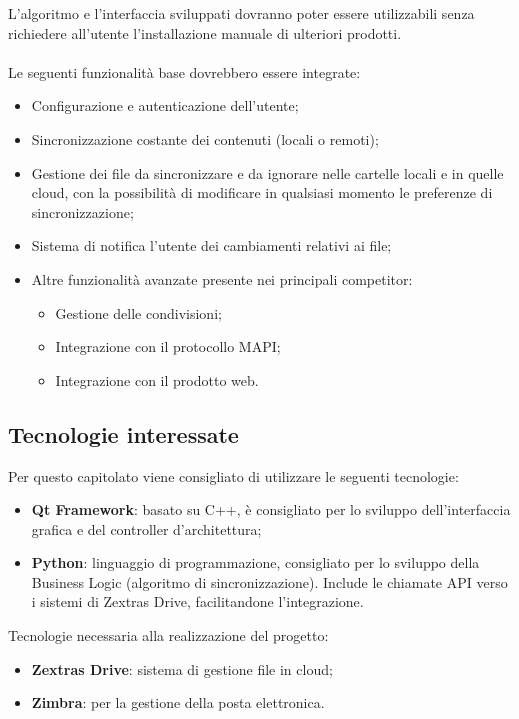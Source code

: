 \documentclass[../studio-di-fattibilita.tex]{subfiles}
\begin{document}
L’algoritmo e l’interfaccia sviluppati dovranno poter essere utilizzabili senza richiedere all’utente l’installazione manuale di ulteriori prodotti.\\ \\

Le seguenti funzionalità base dovrebbero essere integrate:
\begin{itemize}
  \item Configurazione e autenticazione dell’utente;
  \item Sincronizzazione costante dei contenuti (locali o remoti);
  \item Gestione dei file da sincronizzare e da ignorare nelle cartelle locali e in quelle cloud, con la possibilità di modificare in qualsiasi momento le preferenze di sincronizzazione;
  \item Sistema di notifica l’utente dei cambiamenti relativi ai file; 
  \item Altre funzionalità avanzate presente nei principali competitor:
  \begin{itemize}
    \item Gestione delle condivisioni;
    \item Integrazione con il protocollo MAPI;
    \item Integrazione con il prodotto web.
  \end{itemize}
\end{itemize}

\subsection{Tecnologie interessate}%
\label{sub:c7_tecnologie_interessate}
Per questo capitolato viene consigliato di utilizzare le seguenti tecnologie:
\begin{itemize}
  \item \textbf{Qt Framework}: basato su C++, è consigliato per lo sviluppo dell’interfaccia grafica e del controller d’architettura;
  \item \textbf{Python}: linguaggio di programmazione, consigliato per lo sviluppo della Business Logic (algoritmo di sincronizzazione). Include le chiamate API verso i sistemi di Zextras Drive, facilitandone l’integrazione.
\end{itemize}

Tecnologie necessaria alla realizzazione del progetto:
\begin{itemize}
  \item \textbf{Zextras Drive}: sistema di gestione file in cloud;
  \item \textbf{Zimbra}:  per la gestione della posta elettronica.
\end{itemize}
\end{document}
